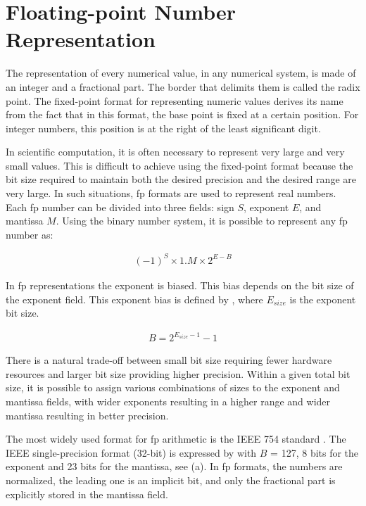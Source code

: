 \section{Floating-point Number Representation}
The representation of every numerical value, in any numerical system, is made of an integer and a fractional part. The border that delimits them is called the radix point. The fixed-point format for representing numeric values derives its name from the fact that in this format, the base point is fixed at a certain position. For integer numbers, this position is at the right of the least significant digit.

In scientific computation, it is often necessary to represent very large and very small values. This is difficult to achieve using the fixed-point format because the bit size required to maintain both the desired precision and the desired range are very large. In such situations, \gls{fp} formats are used to represent real numbers. Each \gls{fp} number can be divided into three fields: sign $S$, exponent $E$, and mantissa $M$. Using the binary number system, it is possible to represent any \gls{fp} number as:

\begin{eqnarray} \label{eq:float}
(-1)^{S} \times 1.M \times 2^{E-B}
\end{eqnarray}

In \gls{fp} representations the exponent is biased. This bias depends on the bit size of the exponent field. This exponent bias is defined by , where $E_{size}$ is the exponent bit size.

\begin{eqnarray} \label{eq:float_bias}
B=2^{E_{size}-1}-1
\end{eqnarray}

There is a natural trade-off between small bit size requiring fewer hardware resources and larger bit size providing higher precision. Within a given total bit size, it is possible to assign various combinations of sizes to the exponent and mantissa fields, with wider exponents resulting in a higher range and wider mantissa resulting in better precision.

The most widely used format for \gls{fp} arithmetic is the IEEE 754 standard \cite{zuras2008ieee}. The IEEE single-precision format (32-bit) is expressed by  with $B$ = 127, 8 bits for the exponent and 23 bits for the mantissa, see (a). In \gls{fp} formats, the numbers are normalized, the leading one is an implicit bit, and only the fractional part is explicitly stored in the mantissa field.

